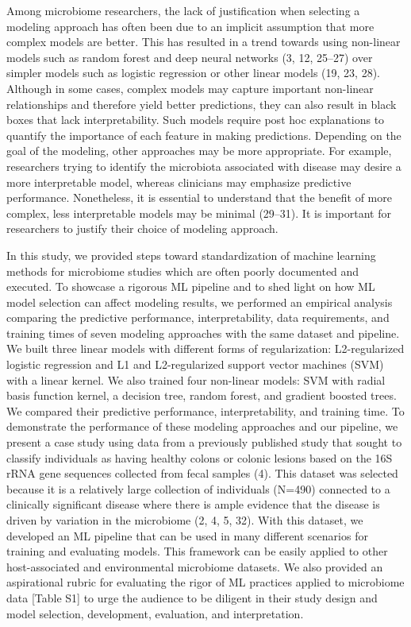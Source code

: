 \documentclass[
  11pt,
]{article}
\begin{document}
Among microbiome researchers, the lack of justification when selecting a
modeling approach has often been due to an implicit assumption that more
complex models are better. This has resulted in a trend towards using
non-linear models such as random forest and deep neural networks (3, 12,
25--27) over simpler models such as logistic regression or other linear
models (19, 23, 28). Although in some cases, complex models may capture
important non-linear relationships and therefore yield better
predictions, they can also result in black boxes that lack
interpretability. Such models require post hoc explanations to quantify
the importance of each feature in making predictions. Depending on the
goal of the modeling, other approaches may be more appropriate. For
example, researchers trying to identify the microbiota associated with
disease may desire a more interpretable model, whereas clinicians may
emphasize predictive performance. Nonetheless, it is essential to
understand that the benefit of more complex, less interpretable models
may be minimal (29--31). It is important for researchers to justify
their choice of modeling approach.

In this study, we provided steps toward standardization of machine
learning methods for microbiome studies which are often poorly
documented and executed. To showcase a rigorous ML pipeline and to shed
light on how ML model selection can affect modeling results, we
performed an empirical analysis comparing the predictive performance,
interpretability, data requirements, and training times of seven
modeling approaches with the same dataset and pipeline. We built three
linear models with different forms of regularization: L2-regularized
logistic regression and L1 and L2-regularized support vector machines
(SVM) with a linear kernel. We also trained four non-linear models: SVM
with radial basis function kernel, a decision tree, random forest, and
gradient boosted trees. We compared their predictive performance,
interpretability, and training time. To demonstrate the performance of
these modeling approaches and our pipeline, we present a case study
using data from a previously published study that sought to classify
individuals as having healthy colons or colonic lesions based on the 16S
rRNA gene sequences collected from fecal samples (4). This dataset was
selected because it is a relatively large collection of individuals
(N=490) connected to a clinically significant disease where there is
ample evidence that the disease is driven by variation in the microbiome
(2, 4, 5, 32). With this dataset, we developed an ML pipeline that can
be used in many different scenarios for training and evaluating models.
This framework can be easily applied to other host-associated and
environmental microbiome datasets. We also provided an aspirational
rubric for evaluating the rigor of ML practices applied to microbiome
data {[}Table S1{]} to urge the audience to be diligent in their study
design and model selection, development, evaluation, and interpretation.
\end{document}
